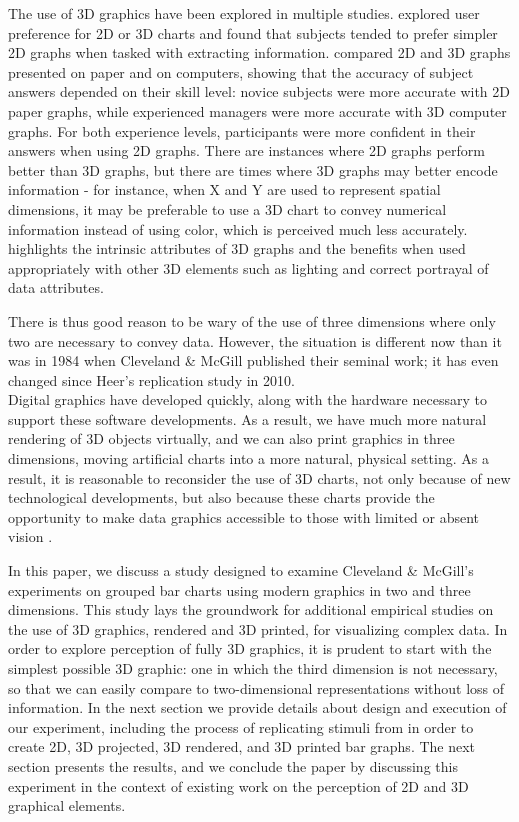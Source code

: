 \documentclass[letterpaper,inpress,dvipsnames]{jdsart}
\begin{document}
The use of 3D graphics have been explored in multiple studies.
\citet{fisher_data_1997} explored user preference for 2D or 3D charts and found that subjects tended to prefer simpler 2D graphs when tasked with extracting information.
\citet{barfield_effects_1989} compared 2D and 3D graphs presented on paper and on computers, showing that the accuracy of subject answers depended on their skill level: novice subjects were more accurate with 2D paper graphs, while experienced managers were more accurate with 3D computer graphs.
For both experience levels, participants were more confident in their answers when using 2D graphs.
There are instances where 2D graphs perform better than 3D graphs, but there are times where 3D graphs may better encode information - for instance, when X and Y are used to represent spatial dimensions, it may be preferable to use a 3D chart to convey numerical information instead of using color, which is perceived much less accurately.
\citet{brath_3d_2014} highlights the intrinsic attributes of 3D graphs and the benefits when used appropriately with other 3D elements such as lighting and correct portrayal of data attributes.

There is thus good reason to be wary of the use of three dimensions where only two are necessary to convey data.
However, the situation is different now than it was in 1984 when Cleveland \& McGill published their seminal work; it has even changed since Heer's replication study \citeyearpar{heerCrowdsourcingGraphicalPerception2010b} in 2010.\\
Digital graphics have developed quickly, along with the hardware necessary to support these software developments.
As a result, we have much more natural rendering of 3D objects virtually, and we can also print graphics in three dimensions, moving artificial charts into a more natural, physical setting.
As a result, it is reasonable to reconsider the use of 3D charts, not only because of new technological developments, but also because these charts provide the opportunity to make data graphics accessible to those with limited or absent vision \citep{fleetHowTactileGraphics2023}.

In this paper, we discuss a study designed to examine Cleveland \& McGill's experiments on grouped bar charts using modern graphics in two and three dimensions. This study lays the groundwork for additional empirical studies on the use of 3D graphics, rendered and 3D printed, for visualizing complex data. In order to explore perception of fully 3D graphics, it is prudent to start with the simplest possible 3D graphic: one in which the third dimension is not necessary, so that we can easily compare to two-dimensional representations without loss of information.
In the next section we provide details about design and execution of our experiment, including the process of replicating stimuli from \citet{clevelandGraphics1984} in order to create 2D, 3D projected, 3D rendered, and 3D printed bar graphs. The next section presents the results, and we conclude the paper by discussing this experiment in the context of existing work on the perception of 2D and 3D graphical elements.
\end{document}
